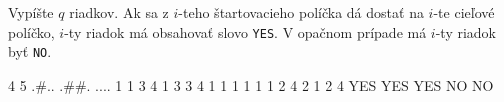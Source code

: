 
Vypíšte $q$ riadkov. Ak sa z $i$-teho štartovacieho políčka dá dostať na $i$-te cieľové políčko,
$i$-ty riadok má obsahovať slovo \texttt{YES}. V opačnom prípade má $i$-ty riadok byť \texttt{NO}.


 4 5
.\#..
.\#\#.
....
1 1 3 4
1 3 3 4
1 1 1 1
1 1 2 4
2 1 2 4
\sampleOUT
YES
YES
YES
NO
NO
\sampleEND


